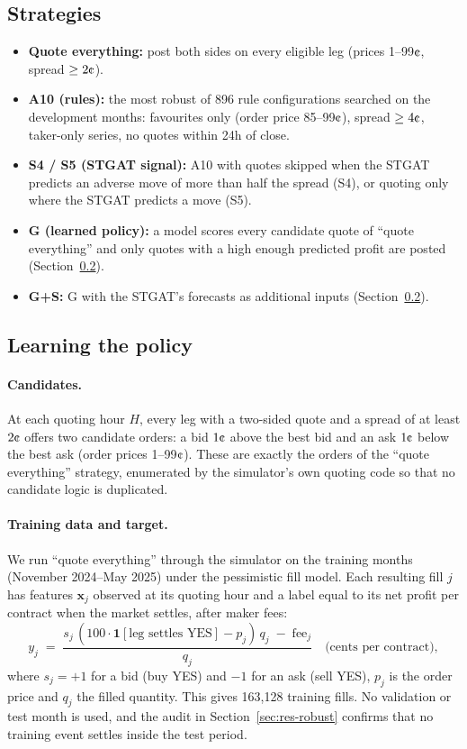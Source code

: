 \documentclass[11pt,a4paper]{article}
\newcommand{\cent}{\text{\textcent}}
\begin{document}
\subsection{Strategies}
\begin{itemize}
  \item \textbf{Quote everything:} post both sides on every eligible leg (prices 1--99$\cent$, spread $\ge 2\cent$).
  \item \textbf{A10 (rules):} the most robust of 896 rule configurations searched on the development months:
    favourites only (order price 85--99$\cent$), spread $\ge 4\cent$, taker-only series, no quotes within 24h of
    close.
  \item \textbf{S4 / S5 (STGAT signal):} A10 with quotes skipped when the STGAT predicts an adverse move of more than
    half the spread (S4), or quoting only where the STGAT predicts a move (S5).
  \item \textbf{G (learned policy):} a model scores every candidate quote of ``quote everything'' and only quotes
    with a high enough predicted profit are posted (Section~\ref{sec:learning-policy}).
  \item \textbf{G+S:} G with the STGAT's forecasts as additional inputs (Section~\ref{sec:learning-policy}).
\end{itemize}

\subsection{Learning the policy}\label{sec:learning-policy}

\paragraph{Candidates.} At each quoting hour $H$, every leg with a two-sided quote and a spread of at least $2\cent$
offers two candidate orders: a bid $1\cent$ above the best bid and an ask $1\cent$ below the best ask (order prices
1--99$\cent$). These are exactly the orders of the ``quote everything'' strategy, enumerated by the simulator's own
quoting code so that no candidate logic is duplicated.

\paragraph{Training data and target.} We run ``quote everything'' through the simulator on the training months
(November 2024--May 2025) under the pessimistic fill model. Each resulting fill $j$ has features $\bm{x}_j$ observed
at its quoting hour and a label equal to its net profit per contract when the market settles, after maker fees:
\begin{equation}
  y_j \;=\; \frac{s_j\,(100\cdot\mathbf{1}[\text{leg settles YES}] - p_j)\,q_j \;-\; \text{fee}_j}{q_j}
  \quad\text{(cents per contract)},
\end{equation}
where $s_j=+1$ for a bid (buy YES) and $-1$ for an ask (sell YES), $p_j$ is the order price and $q_j$ the filled
quantity. This gives 163{,}128 training fills. No validation or test month is used, and the audit in
Section~\ref{sec:res-robust} confirms that no training event settles inside the test period.
\end{document}
